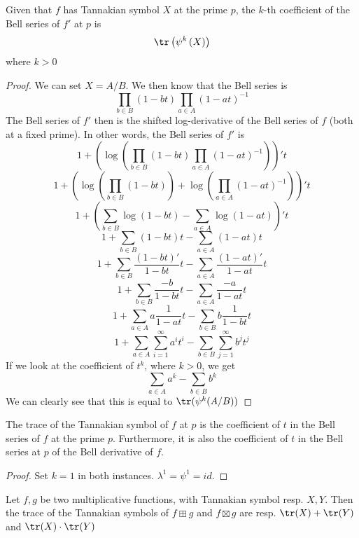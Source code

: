 \documentclass[a4paper]{article}
\begin{document}
\begin{theorem}
Given that $f$ has Tannakian symbol $X$ at the prime $p$, the $k$-th coefficient of the Bell series of $f'$ at $p$ is
$$\tr\left(\psi^k\left(X\right)\right)$$
where $k > 0$
\end{theorem}

\begin{proof}
We can set $X = A/B$. We then know that the Bell series is
$$\prod_{b \in B}\left(1 - bt\right)\prod_{a \in A}\left(1 - at\right)^{-1}$$
The Bell series of $f'$ then is the shifted log-derivative of the Bell series of $f$ (both at a fixed prime). In other words, the Bell series of $f'$ is
$$1 + \left(\log\left(\prod_{b \in B}\left(1 - bt\right)\prod_{a \in A}\left(1 - at\right)^{-1}\right)\right)'t$$
$$1 + \left(\log\left(\prod_{b \in B}\left(1 - bt\right)\right) + \log\left(\prod_{a \in A}\left(1 - at\right)^{-1}\right)\right)'t$$
$$1 + \left(\sum_{b \in B}\log\left(1 - bt\right) - \sum_{a \in A}\log\left(1 - at\right)\right)'t$$
$$1 + \sum_{b \in B}\left(1 - bt\right)t - \sum_{a \in A}\left(1 - at\right)t$$
$$1 + \sum_{b \in B}\frac{(1 - bt)'}{1 - bt}t - \sum_{a \in A}\frac{(1 - at)'}{1 - at} t$$
$$1 + \sum_{b \in B}\frac{ -b}{1 - bt}t - \sum_{a \in A}\frac{ -a }{1 - at} t$$
$$1 + \sum_{a \in A}a\frac{ 1 }{1 - at} t - \sum_{b \in B}b\frac{ 1}{1 - bt}t$$
$$1 + \sum_{a \in A}\sum_{i=1}^\infty a^it^i- \sum_{b \in B}\sum_{j=1}^\infty b^jt^j$$
If we look at the coefficient of $t^k$, where $k > 0$, we get
$$\sum_{a \in A} a^k - \sum_{b \in B} b^k$$
We can clearly see that this is equal to $\tr(\psi^k(A/B))$
\end{proof}

\begin{corollary}
The trace of the Tannakian symbol of $f$ at $p$ is the coefficient of $t$ in the Bell series of $f$ at the prime $p$. Furthermore, it is also the coefficient of $t$ in the Bell series at $p$ of the Bell derivative of $f$.
\end{corollary}

\begin{proof}
Set $k = 1$ in both instances. $\lambda^1 = \psi^1 = id$.
\end{proof}

\begin{proposition}
Let $f, g$ be two multiplicative functions, with Tannakian symbol resp. $X, Y$. Then the trace of the Tannakian symbols of $f \boxplus g$ and $f \boxtimes g$ are resp. $\tr(X) + \tr(Y)$ and $\tr(X) \cdot \tr(Y)$
\end{proposition}
\end{document}
